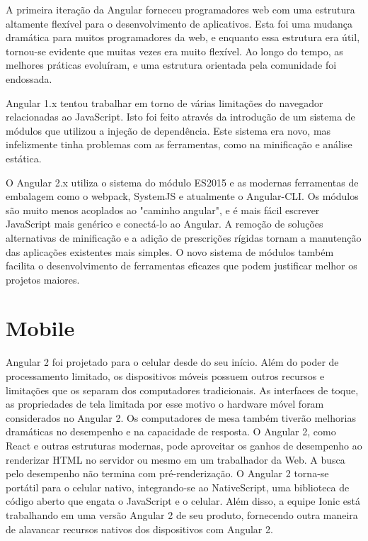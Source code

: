 \documentclass[12pt]{article}
\begin{document}
A primeira iteração da Angular forneceu programadores web com uma estrutura altamente flexível para o desenvolvimento de aplicativos. Esta foi uma mudança dramática para muitos programadores da web, e enquanto essa estrutura era útil, tornou-se evidente que muitas vezes era muito flexível. Ao longo do tempo, as melhores práticas evoluíram, e uma estrutura orientada pela comunidade foi endossada.

Angular 1.x tentou trabalhar em torno de várias limitações do navegador relacionadas ao JavaScript. Isto foi feito através da introdução de um sistema de módulos que utilizou a injeção de dependência. Este sistema era novo, mas infelizmente tinha problemas com as ferramentas, como na minificação e análise estática.

O Angular 2.x utiliza o sistema do módulo ES2015 e as modernas ferramentas de embalagem como o webpack, SystemJS e atualmente o Angular-CLI. Os módulos são muito menos acoplados ao "caminho angular", e é mais fácil escrever JavaScript mais genérico e conectá-lo ao Angular. A remoção de soluções alternativas de minificação e a adição de prescrições rígidas tornam a manutenção das aplicações existentes mais simples. O novo sistema de módulos também facilita o desenvolvimento de ferramentas eficazes que podem justificar melhor os projetos maiores.\cite{bierman2014understanding}

\section{Mobile}

Angular 2 foi projetado para o celular desde do seu início. Além do poder de processamento limitado, os dispositivos móveis possuem outros recursos e limitações que os separam dos computadores tradicionais. As interfaces de toque, as propriedades de tela limitada por esse motivo o hardware móvel foram considerados no Angular 2.
Os computadores de mesa também tiverão melhorias dramáticas no desempenho e na capacidade de resposta.
O Angular 2, como React e outras estruturas modernas, pode aproveitar os ganhos de desempenho ao renderizar HTML no servidor ou mesmo em um trabalhador da Web. A busca pelo desempenho não termina com pré-renderização. O Angular 2 torna-se portátil para o celular nativo, integrando-se ao NativeScript, uma biblioteca de código aberto que engata o JavaScript e o celular. Além disso, a equipe Ionic está trabalhando em uma versão Angular 2 de seu produto, fornecendo outra maneira de alavancar recursos nativos dos dispositivos com Angular 2.
\end{document}
